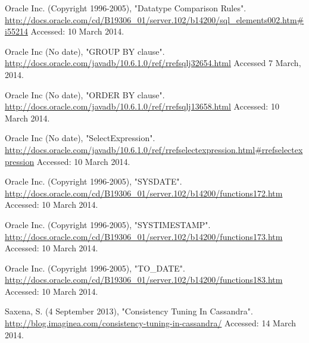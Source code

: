 \documentclass[letterpaper]{article}
\begin{document}
Oracle Inc. (Copyright 1996-2005), "Datatype Comparison Rules".
\url{http://docs.oracle.com/cd/B19306_01/server.102/b14200/sql_elements002.htm#i55214}
Accessed: 10 March 2014.

Oracle Inc (No date), "GROUP BY clause".
\url{http://docs.oracle.com/javadb/10.6.1.0/ref/rrefsqlj32654.html}
Accessed 7 March, 2014.

Oracle Inc (No date), "ORDER BY clause".
\url{http://docs.oracle.com/javadb/10.6.1.0/ref/rrefsqlj13658.html}
Accessed: 10 March 2014.

Oracle Inc (No date), "SelectExpression".
\url{http://docs.oracle.com/javadb/10.6.1.0/ref/rrefselectexpression.html#rrefselectexpression}
Accessed: 10 March 2014.

Oracle Inc. (Copyright 1996-2005), "SYSDATE".
\url{http://docs.oracle.com/cd/B19306_01/server.102/b14200/functions172.htm}
Accessed: 10 March 2014.

Oracle Inc. (Copyright 1996-2005), "SYSTIMESTAMP".
\url{http://docs.oracle.com/cd/B19306_01/server.102/b14200/functions173.htm}
Accessed: 10 March 2014.

Oracle Inc. (Copyright 1996-2005), "TO\_DATE".
\url{http://docs.oracle.com/cd/B19306_01/server.102/b14200/functions183.htm}
Accessed: 10 March 2014.

Saxena, S. (4 September 2013), "Consistency Tuning In Cassandra".
\url{http://blog.imaginea.com/consistency-tuning-in-cassandra/}
Accessed: 14 March 2014.
\end{document}
